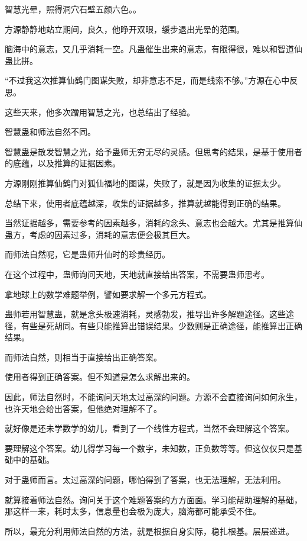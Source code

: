 
\begin{this_body}

智慧光晕，照得洞穴石壁五颜六色。。

方源静静地站立期间，良久，他睁开双眼，缓步退出光晕的范围。

脑海中的意志，又几乎消耗一空。凡蛊催生出来的意志，有限得很，难以和智道仙蛊比拼。

“不过我这次推算仙鹤门图谋失败，却非意志不足，而是线索不够。”方源在心中反思。

这些天来，他多次蹭用智慧之光，也总结出了经验。

智慧蛊和师法自然不同。

智慧蛊是散发智慧之光，给予蛊师无穷无尽的灵感。但思考的结果，是基于使用者的底蕴，以及推算的证据因素。

方源刚刚推算仙鹤门对狐仙福地的图谋，失败了，就是因为收集的证据太少。

总结下来，使用者底蕴越深，收集的证据越多，推算就越能得到正确的结果。

当然证据越多，需要参考的因素越多，消耗的念头、意志也会越大。尤其是推算仙蛊方，考虑的因素过多，消耗的意志便会极其巨大。

而师法自然呢，它是蛊师升仙时的珍贵经历。

在这个过程中，蛊师询问天地，天地就直接给出答案，不需要蛊师思考。

拿地球上的数学难题举例，譬如要求解一个多元方程式。

蛊师若用智慧蛊，就是念头极速消耗，灵感勃发，推导出许多解题途径。这些途径，有些是死胡同。有些只能推算出错误结果。少数则是正确途径，能推算出正确结果。

而师法自然，则相当于直接给出正确答案。

使用者得到正确答案。但不知道是怎么求解出来的。

因此，师法自然时，不能询问天地太过高深的问题。方源不会直接询问如何永生，也许天地会给出答案，但他绝对理解不了。

就好像是还未学数学的幼儿，看到了一个线性方程式，当然不会理解这个答案。

要理解这个答案。幼儿得学习每一个数字，未知数，正负数等等。但这仅仅只是基础中的基础。

对于蛊师而言。太过高深的问题，哪怕得到了答案，也无法理解，无法利用。

就算接着师法自然。询问关于这个难题答案的方方面面。学习能帮助理解的基础，那这样一来，耗时太多，信息量也会极为庞大，脑海都可能承受不住。

所以，最充分利用师法自然的方法，就是根据自身实际，稳扎根基。层层递进。


\end{this_body}
